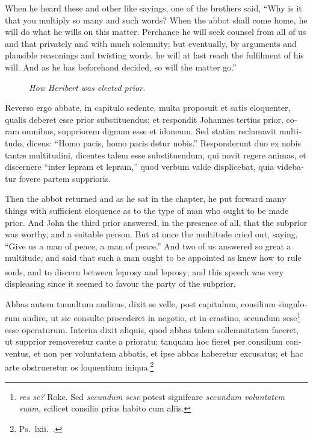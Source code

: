 \documentclass[10pt]{book}
\newcounter{engnote}
\newcommand{\engnotenum}{\textsuperscript{\arabic{engnote}\stepcounter{engnote}}}
\newcommand{\engnotetext}[1]{\vphantom{\footnotemark{}}\footnotetext{#1}}
\newcommand{\blockhead}[4][]{
\begin{figure}
\centering
\vspace{#4}
\parbox{2.75cm}{\begin{center}\footnotesize \color{BrickRed} \emph{#2}\\ #1 \end{center}}
\end{figure}
}
\begin{document}
\begin{paracol}{2}
\switchcolumn

When he heard these and other like sayings, one of the brothers said, ``Why is it that you multiply so many and such words? When the abbot shall come home, he will do what he wills on this matter. Perchance he will seek counsel from all of us and that privately and with much solemnity; but eventually, by arguments and plausible reasonings and twisting words, he will at last reach the fulfilment of his will. And as he has beforehand decided, so will the matter go.''

\switchcolumn*

\begin{otherlanguage}{latin}
\blockhead{How Heribert was elected prior.}{3}{-.55cm}
Reverso ergo abbate, in capitulo sedente, multa proposuit et satis eloquenter, qualis deberet esse prior substituendus; et respondit Johannes tertius prior, coram omnibus, suppriorem dignum esse et idoneum. Sed statim reclamavit multitudo, dicens: ``Homo pacis, homo pacis detur nobis.'' Responderunt duo ex nobis tant\ae{} multitudini, dicentes talem esse substituendum, qui novit regere animas, et discernere ``inter lepram et lepram,''\engnotetext{Deut.\ xvii., \oldstylenums{8}.} quod verbum valde displicebat, quia videbatur fovere partem supprioris. 

\end{otherlanguage}

\switchcolumn

Then the abbot returned and as he sat in the chapter, he put forward many things with sufficient eloquence as to the type of man who ought to be made prior. And John the third prior answered, in the presence of all, that the subprior was worthy, and a suitable person. But at once the multitude cried out, saying, ``Give us a man of peace, a man of peace.'' And two of us answered so great a multitude, and said that such a man ought to be appointed as knew how to rule souls, and to discern between leprosy and leprosy;\engnotenum{} and this speech was very displeasing since it seemed to favour the party of the subprior.

\switchcolumn*

\begin{otherlanguage}{latin}
Abbas autem tumultum audiens, dixit se velle, post capitulum, consilium singulorum audire, ut sic consulte procederet in negotio, et in crastino, secundum sese\footnote[\textdagger]{\emph{res se?} Roke. Sed \emph{secundum sese} potest signifcare \emph{secundum voluntatem suam,} scilicet consilio prius habito cum aliis.}  esse operaturum. Interim dixit aliquis, quod abbas talem sollemnitatem faceret, ut supprior removeretur caute a prioratu; tanquam hoc fieret per consilium conventus, et non per voluntatem abbatis, et ipse abbas haberetur excusatus; et hac arte obstrueretur os loquentium iniqua.\footnote[\ddag]{Ps.\ lxii.\ .}
\end{otherlanguage}


\end{paracol}
\end{document}
